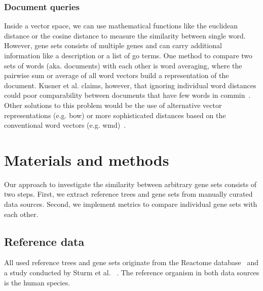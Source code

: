 \documentclass{thesisclass}
\begin{document}

\subsection{Document queries}

Inside a vector space, we can use mathematical functions like the euclidean distance or the cosine distance to measure the similarity between single word. However, gene sets consists of multiple genes and can carry additional information like a description or a list of \acrshort{go} terms. One method to compare two sets of words (aka. documents) with each other is word averaging, where the pairwise sum or average of all word vectors build a representation of the document. Kusner et al. claims, however, that ignoring individual word distances could poor comparability between documents that have few words in commin~\cite{Kusner:2015:WED:3045118.3045221}. Other solutions to this problem would be the use of alternative vector representations (e.g. \acrfull{bow}) or more sophisticated distances based on the conventional word vectors (e.g. \acrfull{wmd})~\cite{Kusner:2015:WED:3045118.3045221}. 

\chapter{Materials and methods} \label{ch:methods}

Our approach to investigate the similarity between arbitrary gene sets consists of two steps. 
First, we extract reference trees and gene sets from manually curated data sources.
Second, we implement metrics to compare individual gene sets with each other.

\section{Reference data}


All used reference trees and gene sets originate from the Reactome database~\cite{doi:10.1093/nar/gki072} and a study conducted by Sturm et al. ~\cite{Sturm463828}. The reference organism in both data sources is the human species.
\end{document}
